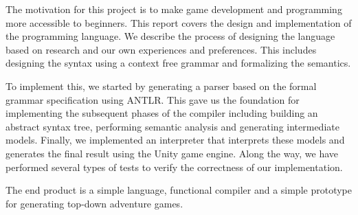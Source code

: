The motivation for this project is to make game development and programming more accessible to beginners.
This report covers the design and implementation of the \dazel{} programming language.
We describe the process of designing the language based on research and our own experiences and preferences.
This includes designing the syntax using a context free grammar and formalizing the semantics.

To implement this, we started by generating a parser based on the formal grammar specification using ANTLR.
This gave us the foundation for implementing the subsequent phases of the \dazel{} compiler including building an abstract syntax tree, performing semantic analysis and generating intermediate models. 
Finally, we implemented an interpreter that interprets these models and generates the final result using the Unity game engine.
Along the way, we have performed several types of tests to verify the correctness of our implementation.

The end product is a simple language, functional compiler and a simple prototype for generating top-down adventure games.